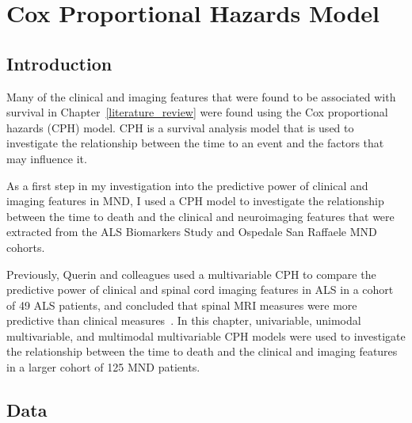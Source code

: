 \chapter{Cox Proportional Hazards Model}
\label{cox_proportional_hazards_model}

\section{Introduction}

Many of the clinical and imaging features that were found to be associated with survival in Chapter~\ref{literature_review} were found using the Cox proportional hazards (CPH) model.
CPH is a survival analysis model that is used to investigate the relationship between the time to an event and the factors that may influence it.

As a first step in my investigation into the predictive power of clinical and imaging features in MND, I used a CPH model to investigate the relationship between the time to death and the clinical and neuroimaging features that were extracted from the ALS Biomarkers Study and Ospedale San Raffaele MND cohorts.

Previously, Querin and colleagues used a multivariable CPH to compare the predictive power of clinical and spinal cord imaging features in ALS in a cohort of 49 ALS patients, and concluded that spinal MRI measures were more predictive than clinical measures~\cite{querinSpinalCordMultiparametric2017}.
In this chapter, univariable, unimodal multivariable, and multimodal multivariable CPH models were used to investigate the relationship between the time to death and the clinical and imaging features in a larger cohort of 125 MND patients.


\section{Data}

